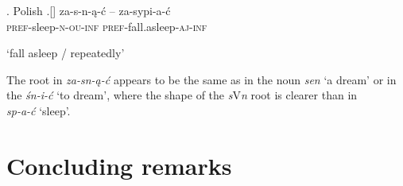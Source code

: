 \ex. Polish
\ag.[] \hspace{-22pt}za-s-n-\k{a}-\'c -- za-sypi-a-\'c\\
\hspace{-22pt}\textsc{pref}-sleep-\textsc{n-ou-inf} {} \textsc{pref}-fall.asleep-\textsc{aj-inf}\\
\hspace{-22pt}\strut  `fall asleep / repeatedly'

The root in \textit{za-sn-\k{a}-\'c} appears to be the same as in the noun \textit{sen} `a dream' or in the  \textit{\'sn-i-\'c} `to dream', where the shape of the  \textit{s}V\textit{n} root is clearer than in 
\\
 \textit{sp-a-\'c} `sleep'.

\section{Concluding remarks}

